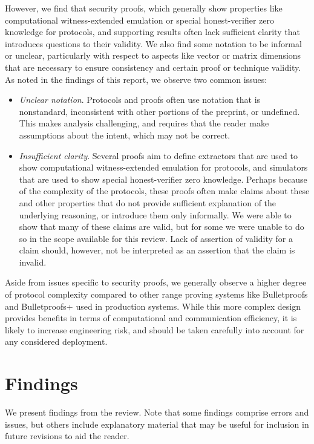 \documentclass{article}
\begin{document}
However, we find that security proofs, which generally show properties like computational witness-extended emulation or special honest-verifier zero knowledge for protocols, and supporting results often lack sufficient clarity that introduces questions to their validity.
We also find some notation to be informal or unclear, particularly with respect to aspects like vector or matrix dimensions that are necessary to ensure consistency and certain proof or technique validity.
As noted in the findings of this report, we observe two common issues:
\begin{itemize}
	\item \textit{Unclear notation}. Protocols and proofs often use notation that is nonstandard, inconsistent with other portions of the preprint, or undefined.
	This makes analysis challenging, and requires that the reader make assumptions about the intent, which may not be correct.
	\item \textit{Insufficient clarity}. Several proofs aim to define extractors that are used to show computational witness-extended emulation for protocols, and simulators that are used to show special honest-verifier zero knowledge.
	Perhaps because of the complexity of the protocols, these proofs often make claims about these and other properties that do not provide sufficient explanation of the underlying reasoning, or introduce them only informally.
	We were able to show that many of these claims are valid, but for some we were unable to do so in the scope available for this review.
	Lack of assertion of validity for a claim should, however, not be interpreted as an assertion that the claim is invalid.
\end{itemize}

Aside from issues specific to security proofs, we generally observe a higher degree of protocol complexity compared to other range proving systems like Bulletproofs and Bulletproofs+ used in production systems.
While this more complex design provides benefits in terms of computational and communication efficiency, it is likely to increase engineering risk, and should be taken carefully into account for any considered deployment.


\section{Findings}

We present findings from the review.
Note that some findings comprise errors and issues, but others include explanatory material that may be useful for inclusion in future revisions to aid the reader.
\end{document}
